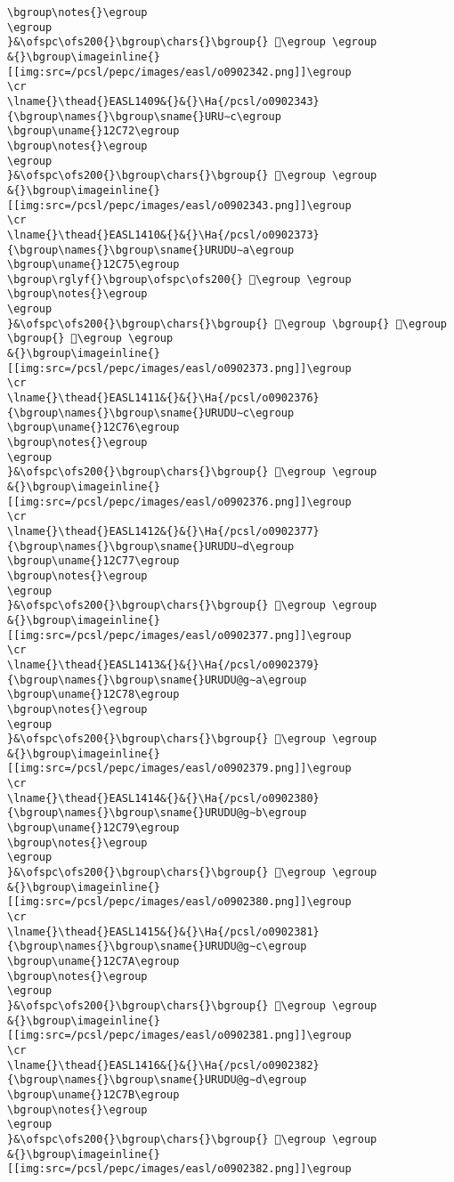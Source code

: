\begin{verbatim}
\bgroup\notes{}\egroup
\egroup
}&\ofspc\ofs200{}\bgroup\chars{}\bgroup{} 𒱱\egroup \egroup
&{}\bgroup\imageinline{}[[img:src=/pcsl/pepc/images/easl/o0902342.png]]\egroup
\cr
\lname{}\thead{}EASL1409&{}&{}\Ha{/pcsl/o0902343}{\bgroup\names{}\bgroup\sname{}URU∼c\egroup
\bgroup\uname{}12C72\egroup
\bgroup\notes{}\egroup
\egroup
}&\ofspc\ofs200{}\bgroup\chars{}\bgroup{} 𒱲\egroup \egroup
&{}\bgroup\imageinline{}[[img:src=/pcsl/pepc/images/easl/o0902343.png]]\egroup
\cr
\lname{}\thead{}EASL1410&{}&{}\Ha{/pcsl/o0902373}{\bgroup\names{}\bgroup\sname{}URUDU∼a\egroup
\bgroup\uname{}12C75\egroup
\bgroup\rglyf{}\bgroup\ofspc\ofs200{} 𒱵\egroup \egroup
\bgroup\notes{}\egroup
\egroup
}&\ofspc\ofs200{}\bgroup\chars{}\bgroup{} 𒱳\egroup \bgroup{} 𒱴\egroup \bgroup{} 𒱵\egroup \egroup
&{}\bgroup\imageinline{}[[img:src=/pcsl/pepc/images/easl/o0902373.png]]\egroup
\cr
\lname{}\thead{}EASL1411&{}&{}\Ha{/pcsl/o0902376}{\bgroup\names{}\bgroup\sname{}URUDU∼c\egroup
\bgroup\uname{}12C76\egroup
\bgroup\notes{}\egroup
\egroup
}&\ofspc\ofs200{}\bgroup\chars{}\bgroup{} 𒱶\egroup \egroup
&{}\bgroup\imageinline{}[[img:src=/pcsl/pepc/images/easl/o0902376.png]]\egroup
\cr
\lname{}\thead{}EASL1412&{}&{}\Ha{/pcsl/o0902377}{\bgroup\names{}\bgroup\sname{}URUDU∼d\egroup
\bgroup\uname{}12C77\egroup
\bgroup\notes{}\egroup
\egroup
}&\ofspc\ofs200{}\bgroup\chars{}\bgroup{} 𒱷\egroup \egroup
&{}\bgroup\imageinline{}[[img:src=/pcsl/pepc/images/easl/o0902377.png]]\egroup
\cr
\lname{}\thead{}EASL1413&{}&{}\Ha{/pcsl/o0902379}{\bgroup\names{}\bgroup\sname{}URUDU@g∼a\egroup
\bgroup\uname{}12C78\egroup
\bgroup\notes{}\egroup
\egroup
}&\ofspc\ofs200{}\bgroup\chars{}\bgroup{} 𒱸\egroup \egroup
&{}\bgroup\imageinline{}[[img:src=/pcsl/pepc/images/easl/o0902379.png]]\egroup
\cr
\lname{}\thead{}EASL1414&{}&{}\Ha{/pcsl/o0902380}{\bgroup\names{}\bgroup\sname{}URUDU@g∼b\egroup
\bgroup\uname{}12C79\egroup
\bgroup\notes{}\egroup
\egroup
}&\ofspc\ofs200{}\bgroup\chars{}\bgroup{} 𒱹\egroup \egroup
&{}\bgroup\imageinline{}[[img:src=/pcsl/pepc/images/easl/o0902380.png]]\egroup
\cr
\lname{}\thead{}EASL1415&{}&{}\Ha{/pcsl/o0902381}{\bgroup\names{}\bgroup\sname{}URUDU@g∼c\egroup
\bgroup\uname{}12C7A\egroup
\bgroup\notes{}\egroup
\egroup
}&\ofspc\ofs200{}\bgroup\chars{}\bgroup{} 𒱺\egroup \egroup
&{}\bgroup\imageinline{}[[img:src=/pcsl/pepc/images/easl/o0902381.png]]\egroup
\cr
\lname{}\thead{}EASL1416&{}&{}\Ha{/pcsl/o0902382}{\bgroup\names{}\bgroup\sname{}URUDU@g∼d\egroup
\bgroup\uname{}12C7B\egroup
\bgroup\notes{}\egroup
\egroup
}&\ofspc\ofs200{}\bgroup\chars{}\bgroup{} 𒱻\egroup \egroup
&{}\bgroup\imageinline{}[[img:src=/pcsl/pepc/images/easl/o0902382.png]]\egroup

\end{verbatim}

